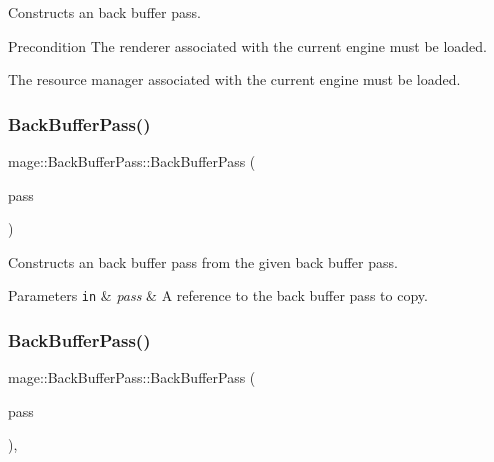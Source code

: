 Constructs an back buffer pass.

\begin{DoxyPrecond}{Precondition}
The renderer associated with the current engine must be loaded. 

The resource manager associated with the current engine must be loaded. 
\end{DoxyPrecond}
\hypertarget{classmage_1_1_back_buffer_pass_a34cba227e301258e8fc9432124bc63cf}{}\label{classmage_1_1_back_buffer_pass_a34cba227e301258e8fc9432124bc63cf} 
\subsubsection{\texorpdfstring{Back\+Buffer\+Pass()}{BackBufferPass()}\hspace{0.1cm}{\footnotesize\ttfamily [2/3]}}
{\footnotesize\ttfamily mage\+::\+Back\+Buffer\+Pass\+::\+Back\+Buffer\+Pass (\begin{DoxyParamCaption}\item[{const \hyperlink{classmage_1_1_back_buffer_pass}{Back\+Buffer\+Pass} \&}]{pass }\end{DoxyParamCaption})\hspace{0.3cm}{\ttfamily [delete]}}

Constructs an back buffer pass from the given back buffer pass.


\begin{DoxyParams}[1]{Parameters}
\mbox{\tt in}  & {\em pass} & A reference to the back buffer pass to copy. \\
\hline
\end{DoxyParams}
\hypertarget{classmage_1_1_back_buffer_pass_a1ac5e5c055eecb094f449496c1475049}{}\label{classmage_1_1_back_buffer_pass_a1ac5e5c055eecb094f449496c1475049} 
\subsubsection{\texorpdfstring{Back\+Buffer\+Pass()}{BackBufferPass()}\hspace{0.1cm}{\footnotesize\ttfamily [3/3]}}
{\footnotesize\ttfamily mage\+::\+Back\+Buffer\+Pass\+::\+Back\+Buffer\+Pass (\begin{DoxyParamCaption}\item[{\hyperlink{classmage_1_1_back_buffer_pass}{Back\+Buffer\+Pass} \&\&}]{pass }\end{DoxyParamCaption})\hspace{0.3cm}{\ttfamily [default]}, {\ttfamily [noexcept]}}

